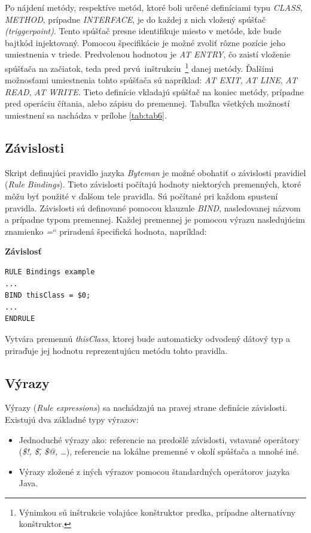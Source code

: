 \documentclass[11pt,final,oneside]{fithesis}
\newcommand\qt[1]{\quotedblbase #1\textquotedblleft}%
\newenvironment{example}[1]
{
\vspace{3mm}
\noindent\textbf{#1}
\vspace{2mm}
}
{
\vspace{3mm}
}
\begin{document}
Po nájdení metódy, respektíve metód, ktoré boli určené definíciami typu
\textit{CLASS}, \textit{METHOD}, prípadne \textit{INTERFACE}, je do každej z 
nich vložený spúšťač \textit{(triggerpoint)}. Tento spúšťač presne 
identifikuje miesto v metóde, kde bude bajtkód injektovaný. Pomocou 
špecifikácie je možné zvoliť rôzne pozície jeho umiestnenia v triede. 
Predvolenou hodnotou je \textit{AT ENTRY}, čo zaistí vloženie spúšťača na 
začiatok, teda pred prvú~inštrukciu~\footnote{Výnimkou sú inštrukcie volajúce 
konštruktor predka, prípadne alternatívny konštruktor.} danej metódy. Ďalšími 
možnosťami umiestnenia tohto spúšťača sú napríklad: \textit{AT EXIT},
\textit{AT LINE}, \textit{AT READ}, \textit{AT WRITE}. Tieto definície 
vkladajú spúšťač na koniec metódy, prípadne pred operáciu čítania, alebo 
zápisu do premennej. Tabuľka všetkých možností umiestnení sa nachádza v
prílohe \ref{tab:tab6}.

\subsection{Závislosti}
Skript definujúci  pravidlo jazyka \textit{Byteman} je možné obohatiť o 
závislosti pravidiel (\textit{Rule Bindings}). Tieto závislosti 
počítajú hodnoty niektorých premenných, ktoré môžu byť použité v ďalšom tele 
pravidla. Sú počítané pri každom spustení pravidla. Závislosti sú definované 
pomocou klauzule \textit{BIND}, nasledovanej názvom a prípadne typom premennej.
Každej premennej je pomocou výrazu nasledujúcim znamienko \qt{\textit{=}} 
priradená špecifická hodnota, napríklad:

\begin{example}{Závislosť}
\begin{verbatim}
RULE Bindings example
...
BIND thisClass = $0;
...
ENDRULE
\end{verbatim}
\end{example}

Vytvára premennú \textit{thisClass}, ktorej bude automaticky odvodený dátový typ a priraďuje jej hodnotu reprezentujúcu metódu tohto pravidla.

\subsection{Výrazy}
Výrazy (\textit{Rule expressions}) sa nachádzajú na pravej strane definície 
závislosti. Existujú dva základné typy výrazov:
\begin{itemize}
\item Jednoduché výrazy ako: referencie na predošlé závislosti, 
vstavané operátory (\textit{\$!, \$\^, \$@, …}), referencie na lokálne premenné v okolí spúšťača a mnohé iné.
\item Výrazy zložené z iných výrazov pomocou štandardných operátorov jazyka 
Java.
\end{itemize}
\end{document}
